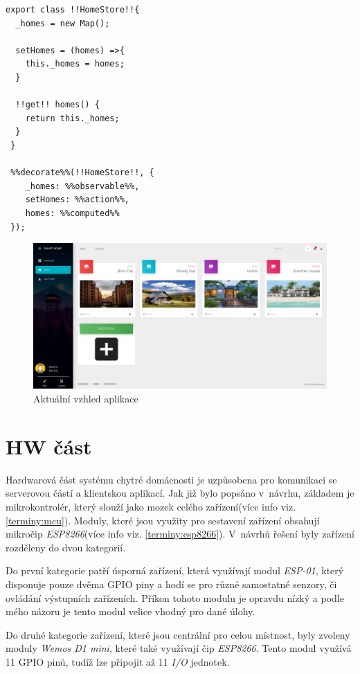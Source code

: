 \begin{lstlisting}[style=JavaScriptStyle,caption={Ukázka vytvoření \emph{store} pro domácnost}]
 export class !!HomeStore!!{
  _homes = new Map();

  setHomes = (homes) =>{
    this._homes = homes;
  }

  !!get!! homes() {
    return this._homes;
  }
 }

 %%decorate%%(!!HomeStore!!, {
    _homes: %%observable%%,
    setHomes: %%action%%,
    homes: %%computed%%
 });
\end{lstlisting}

\begin{figure}[hbt]
  \centering
  \includegraphics[width=1 \linewidth]{obrazky-figures/actualView.png}
  \caption{Aktuální vzhled aplikace}
  \label{figure:actual_app}
\end{figure}

\newpage
\section{HW část}
\label{impl:hw}
Hardwarová část systému chytré domácnosti je uzpůsobena pro komunikaci se serverovou částí a klientskou aplikací.
Jak již bylo popsáno v~návrhu, základem je mikrokontrolér, který slouží jako mozek celého zařízení(více info viz. \ref{terminy:mcu}).
Moduly, které jsou využity pro sestavení zařízení obsahují mikročip \emph{ESP8266}(více info viz. \ref{terminy:esp8266}).
V~návrhů řešení byly zařízení rozděleny do dvou kategorií.

Do první kategorie patří úsporná zařízení, která využívají modul \emph{ESP-01}, který disponuje pouze dvěma GPIO piny a hodí se pro různé samostatné senzory, či ovládání výstupních zařízeních.
Příkon tohoto modulu je opravdu nízký a podle mého názoru je tento modul velice vhodný pro dané úlohy.

Do druhé kategorie zařízení, které jsou centrální pro celou místnost, byly zvoleny moduly \emph{Wemos D1 mini}, které také využívají čip \emph{ESP8266}.
Tento modul využívá 11 GPIO pinů, tudíž lze připojit až 11 \emph{I/O} jednotek.


